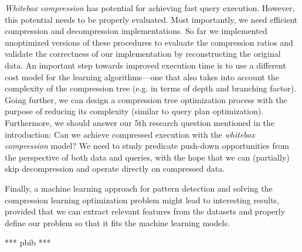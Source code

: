 \textit{Whitebox compression} has potential for achieving fast query execution. However, this potential needs to be properly evaluated. Most importantly, we need efficient compression and decompression implementations. So far we implemented unoptimized versions of these procedures to evaluate the compression ratios and validate the correctness of our implementation by reconstructing the original data. An important step towards improved execution time is to use a different cost model for the learning algorithms---one that also takes into account the complexity of the compression tree (e.g. in terms of depth and branching factor). Going further, we can design a compression tree optimization process with the purpose of reducing its complexity (similar to query plan optimization). Furthermore, we should answer our 5th research question mentioned in the introduction: Can we achieve compressed execution with the \textit{whitebox compression} model? We need to study predicate push-down opportunities from the perspective of both data and queries, with the hope that we can (partially) skip decompression and operate directly on compressed data.

Finally, a machine learning approach for pattern detection and solving the compression learning optimization problem might lead to interesting results, provided that we can extract relevant features from the datasets and properly define our problem so that it fits the machine learning models.

\iffalse

*** pbib ***

